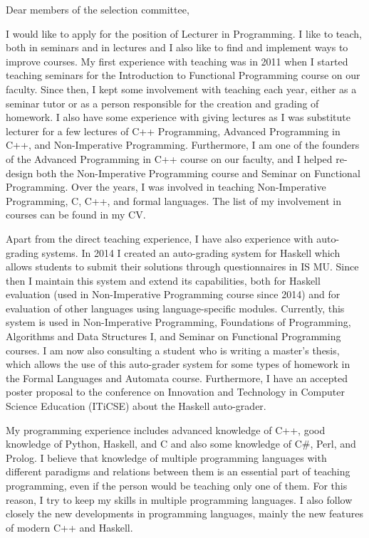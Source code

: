 \documentclass[11pt,a4paper]{article}
\begin{document}
Dear members of the selection committee,

\smallskip
I would like to apply for the position of Lecturer in Programming.
I like to teach, both in seminars and in lectures and I also like to find and implement ways to improve courses.
My first experience with teaching was in 2011 when I started teaching seminars for the Introduction to Functional Programming course on our faculty.
Since then, I kept some involvement with teaching each year, either as a seminar tutor or as a person responsible for the creation and grading of homework.
I also have some experience with giving lectures as I was substitute lecturer for a few lectures of C++ Programming, Advanced Programming in C++, and Non-Imperative Programming.
Furthermore, I am one of the founders of the Advanced Programming in C++ course on our faculty, and I helped re-design both the Non-Imperative Programming course and Seminar on Functional Programming.
Over the years, I was involved in teaching Non-Imperative Programming, C, C++, and formal languages.
The list of my involvement in courses can be found in my CV.

Apart from the direct teaching experience, I have also experience with auto-grading systems.
In 2014 I created an auto-grading system for Haskell which allows students to submit their solutions through questionnaires in IS MU.
Since then I maintain this system and extend its capabilities, both for Haskell evaluation (used in Non-Imperative Programming course since 2014) and for evaluation of other languages using language-specific modules.
Currently, this system is used in Non-Imperative Programming, Foundations of Programming, Algorithms and Data Structures I, and Seminar on Functional Programming courses.
I am now also consulting a student who is writing a master's thesis, which allows the use of this auto-grader system for some types of homework in the Formal Languages and Automata course.
Furthermore, I have an accepted poster proposal to the conference on Innovation and Technology in Computer Science Education (ITiCSE) about the Haskell auto-grader.

My programming experience includes advanced knowledge of C++, good knowledge of Python, Haskell, and C and also some knowledge of C\#, Perl, and Prolog.
I believe that knowledge of multiple programming languages with different paradigms and relations between them is an essential part of teaching programming, even if the person would be teaching only one of them.
For this reason, I try to keep my skills in multiple programming languages.
I also follow closely the new developments in programming languages, mainly the new features of modern C++ and Haskell.
\end{document}
